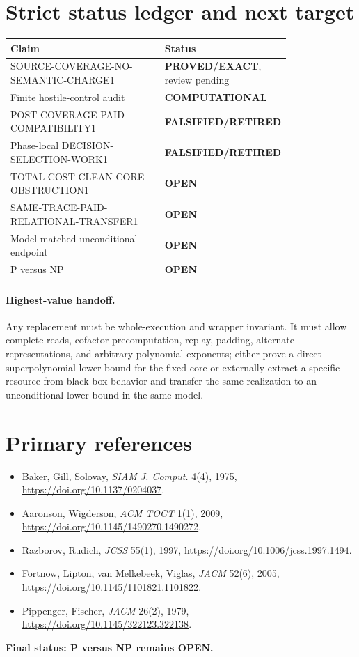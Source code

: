 \documentclass[11pt]{article}
\newcommand{\PROVED}{\textbf{PROVED/EXACT}}
\newcommand{\COMP}{\textbf{COMPUTATIONAL}}
\newcommand{\OPEN}{\textbf{OPEN}}
\newcommand{\RET}{\textbf{FALSIFIED/RETIRED}}
\begin{document}
\section*{Strict status ledger and next target}
\begin{center}
\begin{tabular}{p{0.57\linewidth}p{0.23\linewidth}}
\toprule Claim & Status\\ \midrule
SOURCE-COVERAGE-NO-SEMANTIC-CHARGE1 & \PROVED, review pending\\
Finite hostile-control audit & \COMP\\
POST-COVERAGE-PAID-COMPATIBILITY1 & \RET\\
Phase-local DECISION-SELECTION-WORK1 & \RET\\
TOTAL-COST-CLEAN-CORE-OBSTRUCTION1 & \OPEN\\
SAME-TRACE-PAID-RELATIONAL-TRANSFER1 & \OPEN\\
Model-matched unconditional endpoint & \OPEN\\
P versus NP & \OPEN\\
\bottomrule
\end{tabular}
\end{center}

\paragraph{Highest-value handoff.}
Any replacement must be whole-execution and wrapper invariant. It must allow
complete reads, cofactor precomputation, replay, padding, alternate
representations, and arbitrary polynomial exponents; either prove a direct
superpolynomial lower bound for the fixed core or externally extract a
specific resource from black-box behavior and transfer the same realization
to an unconditional lower bound in the same model.

\section*{Primary references}
\begin{itemize}
\item Baker, Gill, Solovay, \emph{SIAM J. Comput.} 4(4), 1975,
\url{https://doi.org/10.1137/0204037}.
\item Aaronson, Wigderson, \emph{ACM TOCT} 1(1), 2009,
\url{https://doi.org/10.1145/1490270.1490272}.
\item Razborov, Rudich, \emph{JCSS} 55(1), 1997,
\url{https://doi.org/10.1006/jcss.1997.1494}.
\item Fortnow, Lipton, van Melkebeek, Viglas, \emph{JACM} 52(6), 2005,
\url{https://doi.org/10.1145/1101821.1101822}.
\item Pippenger, Fischer, \emph{JACM} 26(2), 1979,
\url{https://doi.org/10.1145/322123.322138}.
\end{itemize}

\bigskip
\noindent\textbf{Final status: P versus NP remains OPEN.}

\end{document}
